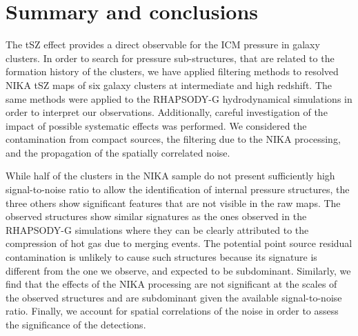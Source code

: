 \documentclass[twocolumn,traditabstract]{aa}
\begin{document}
\section{Summary and conclusions}\label{sec:Summary_and_conclusions}
The tSZ effect provides a direct observable for the ICM pressure in galaxy clusters. In order to search for pressure sub-structures, that are related to the formation history of the clusters, we have applied filtering methods to resolved NIKA tSZ maps of six galaxy clusters at intermediate and high redshift. The same methods were applied to the RHAPSODY-G hydrodynamical simulations in order to interpret our observations. Additionally, careful investigation of the impact of possible systematic effects was performed. We considered the contamination from compact sources, the filtering due to the NIKA processing, and the propagation of the spatially correlated noise.

While half of the clusters in the NIKA sample do not present sufficiently high signal-to-noise ratio to allow the identification of internal pressure structures, the three others show significant features that are not visible in the raw maps. The observed structures show similar signatures as the ones observed in the RHAPSODY-G simulations where they can be clearly attributed to the compression of hot gas due to merging events. The potential point source residual contamination is unlikely to cause such structures because its signature is different from the one we observe, and expected to be subdominant. Similarly, we find that the effects of the NIKA processing are not significant at the scales of the observed structures and are subdominant given the available signal-to-noise ratio. Finally, we account for spatial correlations of the noise in order to assess the significance of the detections.
\end{document}
